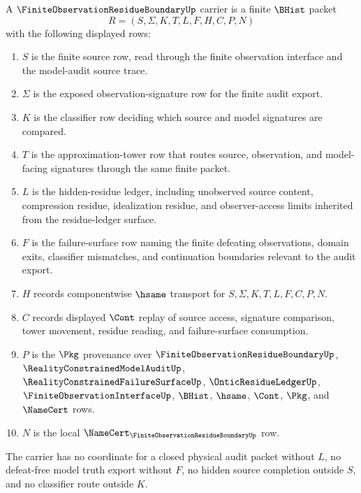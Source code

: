 \begin{definition}
\label{def:finite-observation-residue-boundary-carrier}
A $\FiniteObservationResidueBoundaryUp$ carrier is a finite $\BHist$ packet
$$
R=(S,\Sigma,K,T,L,F,H,C,P,N)
$$
with the following displayed rows:
\begin{enumerate}
\item $S$ is the finite source row, read through the finite observation interface and the model-audit source trace.
\item $\Sigma$ is the exposed observation-signature row for the finite audit export.
\item $K$ is the classifier row deciding which source and model signatures are compared.
\item $T$ is the approximation-tower row that routes source, observation, and model-facing signatures through the same finite packet.
\item $L$ is the hidden-residue ledger, including unobserved source content, compression residue, idealization residue, and observer-access limits inherited from the residue-ledger surface.
\item $F$ is the failure-surface row naming the finite defeating observations, domain exits, classifier mismatches, and continuation boundaries relevant to the audit export.
\item $H$ records componentwise $\hsame$ transport for $S,\Sigma,K,T,L,F,C,P,N$.
\item $C$ records displayed $\Cont$ replay of source access, signature comparison, tower movement, residue reading, and failure-surface consumption.
\item $P$ is the $\Pkg$ provenance over $\FiniteObservationResidueBoundaryUp$, $\RealityConstrainedModelAuditUp$, $\RealityConstrainedFailureSurfaceUp$, $\OnticResidueLedgerUp$, $\FiniteObservationInterfaceUp$, $\BHist$, $\hsame$, $\Cont$, $\Pkg$, and $\NameCert$ rows.
\item $N$ is the local $\NameCert_{\FiniteObservationResidueBoundaryUp}$ row.
\end{enumerate}
The carrier has no coordinate for a closed physical audit packet without $L$, no defeat-free model truth export without $F$, no hidden source completion outside $S$, and no classifier route outside $K$.
\end{definition}

